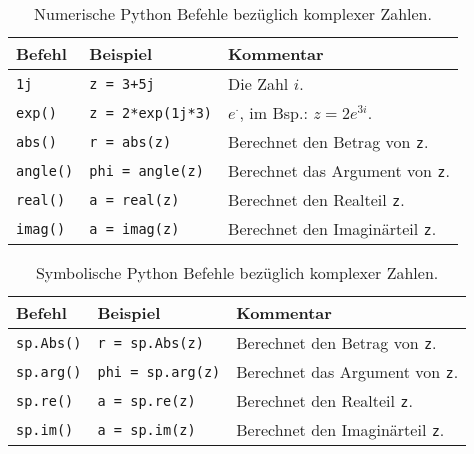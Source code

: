 \begin{table}[H]
    \centering
    \begin{tabular}{|p{3cm}|p{6cm}|p{6cm}|}
        \hline
    \textbf{Befehl} & \textbf{Beispiel} & \textbf{Kommentar} \\ \hline
    
    \texttt{1j} & \texttt{z = 3+5j} & Die Zahl $i$. \\ \hline
    \texttt{exp()} & \texttt{z = 2*exp(1j*3)} & $e^{\cdot}$, im Bsp.: $z = 2e^{3i}$. \\ \hline
    \texttt{abs()} & \texttt{r = abs(z)} & Berechnet den Betrag von \texttt{z}. \\ \hline
    \texttt{angle()} & \texttt{phi = angle(z)} & Berechnet das Argument von \texttt{z}. \\ \hline
    \texttt{real()} & \texttt{a = real(z)} & Berechnet den Realteil \texttt{z}. \\ \hline
    \texttt{imag()} & \texttt{a = imag(z)} & Berechnet den Imaginärteil \texttt{z}. \\ \hline

    \end{tabular}
    \caption{Numerische Python Befehle bezüglich komplexer Zahlen.}
    \label{tab:pyComNumeric}
\end{table}


\begin{table}[H]
    \centering
    \begin{tabular}{|p{3cm}|p{6cm}|p{6cm}|}
        \hline
    \textbf{Befehl} & \textbf{Beispiel} & \textbf{Kommentar} \\ \hline
    \texttt{sp.Abs()} & \texttt{r = sp.Abs(z)} & Berechnet den Betrag von \texttt{z}. \\ \hline
    \texttt{sp.arg()} & \texttt{phi = sp.arg(z)} & Berechnet das Argument von \texttt{z}. \\ \hline
    \texttt{sp.re()} & \texttt{a = sp.re(z)} & Berechnet den Realteil \texttt{z}. \\ \hline
    \texttt{sp.im()} & \texttt{a = sp.im(z)} & Berechnet den Imaginärteil \texttt{z}. \\ \hline

    \end{tabular}
    \caption{Symbolische Python Befehle bezüglich komplexer Zahlen.}
    \label{tab:pyComSymb}
\end{table}


